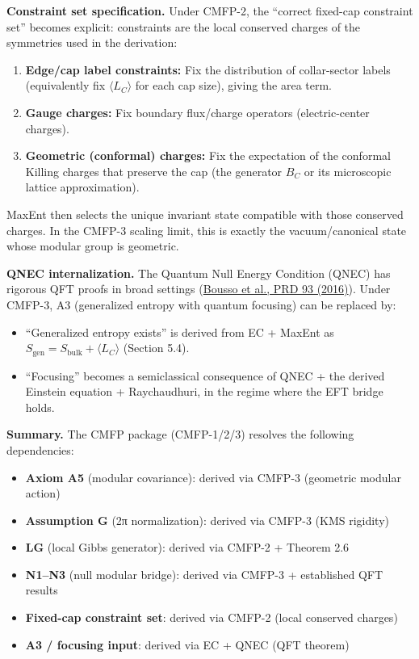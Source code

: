 \documentclass[11pt,a4paper]{article}
\theoremstyle{remark}
\providecommand{\tightlist}{%
  \setlength{\itemsep}{0pt}\setlength{\parskip}{0pt}}
\begin{document}
\textbf{Constraint set specification.} Under CMFP-2, the ``correct fixed-cap
constraint set'' becomes explicit: constraints are the local conserved charges
of the symmetries used in the derivation:

\begin{enumerate}
\def\labelenumi{\arabic{enumi}.}
\item
  \textbf{Edge/cap label constraints:} Fix the distribution of collar-sector labels
  (equivalently fix \(\langle L_C \rangle\) for each cap size), giving the area term.
\item
  \textbf{Gauge charges:} Fix boundary flux/charge operators (electric-center
  charges).
\item
  \textbf{Geometric (conformal) charges:} Fix the expectation of the conformal
  Killing charges that preserve the cap (the generator \(B_C\) or its microscopic
  lattice approximation).
\end{enumerate}

MaxEnt then selects the unique invariant state compatible with those conserved
charges. In the CMFP-3 scaling limit, this is exactly the vacuum/canonical state
whose modular group is geometric.

\textbf{QNEC internalization.} The Quantum Null Energy Condition (QNEC) has rigorous
QFT proofs in broad settings
(\href{https://arxiv.org/abs/1509.02542}{Bousso et al., PRD 93 (2016)}). Under CMFP-3,
A3 (generalized entropy with quantum focusing) can be replaced by:

\begin{itemize}
\item
  ``Generalized entropy exists'' is derived from EC + MaxEnt as
  \(S_{\mathrm{gen}} = S_{\mathrm{bulk}} + \langle L_C \rangle\) (Section 5.4).
\item
  ``Focusing'' becomes a semiclassical consequence of QNEC + the derived Einstein
  equation + Raychaudhuri, in the regime where the EFT bridge holds.
\end{itemize}

\textbf{Summary.} The CMFP package (CMFP-1/2/3) resolves the following dependencies:

\begin{itemize}
\tightlist
\item
  \textbf{Axiom A5} (modular covariance): derived via CMFP-3 (geometric modular action)
\item
  \textbf{Assumption G} (2π normalization): derived via CMFP-3 (KMS rigidity)
\item
  \textbf{LG} (local Gibbs generator): derived via CMFP-2 + Theorem 2.6
\item
  \textbf{N1--N3} (null modular bridge): derived via CMFP-3 + established QFT results
\item
  \textbf{Fixed-cap constraint set}: derived via CMFP-2 (local conserved charges)
\item
  \textbf{A3 / focusing input}: derived via EC + QNEC (QFT theorem)
\end{itemize}
\end{document}
